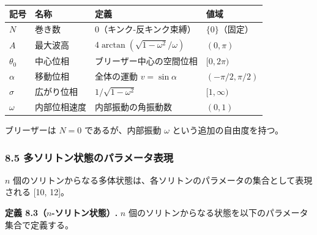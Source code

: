 \documentclass[a4paper,11pt]{ltjsarticle}
\newcounter{none}
\begin{document}
{\def\LTcaptype{none} %
\begin{longtable}[]{@{}
  >{\centering\arraybackslash}p{}
  >{\centering\arraybackslash}p{}
  >{\centering\arraybackslash}p{}
  >{\centering\arraybackslash}p{}@{}}
\toprule\noalign{}
\begin{minipage}[b]{\linewidth}\centering
記号
\end{minipage} & \begin{minipage}[b]{\linewidth}\centering
名称
\end{minipage} & \begin{minipage}[b]{\linewidth}\centering
定義
\end{minipage} & \begin{minipage}[b]{\linewidth}\centering
値域
\end{minipage} \\
\midrule\noalign{}
\endhead
\bottomrule\noalign{}
\endlastfoot
\(N\) & 巻き数 & \(0\)（キンク-反キンク束縛） & \(\{0\}\)（固定） \\
\(A\) & 最大波高 & \(4\arctan(\sqrt{1-\omega^2}/\omega)\) &
\((0, \pi)\) \\
\(\theta_0\) & 中心位相 & ブリーザー中心の空間位相 & \([0, 2\pi)\) \\
\(\alpha\) & 移動位相 & 全体の運動 \(v = \sin\alpha\) &
\((-\pi/2, \pi/2)\) \\
\(\sigma\) & 広がり位相 & \(1/\sqrt{1-\omega^2}\) & \([1, \infty)\) \\
\(\omega\) & 内部位相速度 & 内部振動の角振動数 & \((0, 1)\) \\
\end{longtable}
}

ブリーザーは \(N = 0\) であるが、内部振動 \(\omega\)
という追加の自由度を持つ。

\subsubsection{8.5
多ソリトン状態のパラメータ表現}\label{ux591aux30bdux30eaux30c8ux30f3ux72b6ux614bux306eux30d1ux30e9ux30e1ux30fcux30bfux8868ux73fe}

\(n\)
個のソリトンからなる多体状態は、各ソリトンのパラメータの集合として表現される
{[}10, 12{]}。

\textbf{定義 8.3（\(n\)-ソリトン状態）.} \(n\)
個のソリトンからなる状態を以下のパラメータ集合で定義する。
\end{document}
